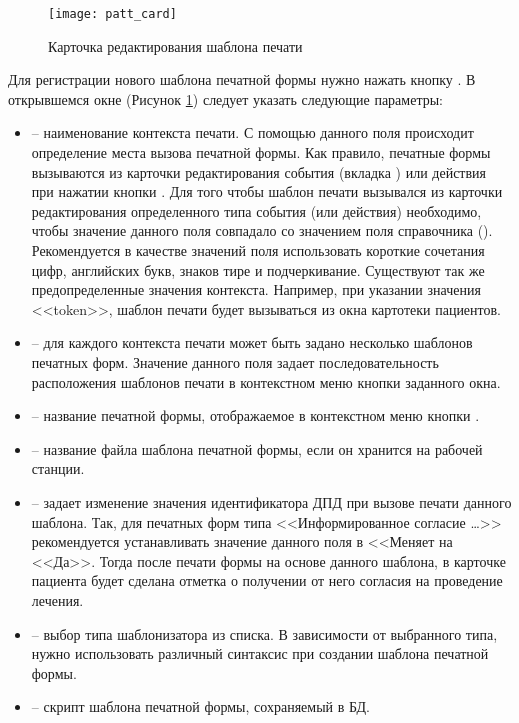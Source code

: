 \begin{figure}[ht]\centering
 \texttt{[image: patt\_card]}
 \caption{Карточка редактирования шаблона печати}
 \label{img_patt_card}
\end{figure}

Для регистрации нового шаблона печатной формы нужно нажать кнопку . В открывшемся окне (Рисунок \ref{img_patt_card}) следует указать следующие параметры:
\begin{itemize}
 \item {} – наименование контекста печати. С помощью данного поля происходит определение места вызова печатной формы. Как правило, печатные формы вызываются из карточки редактирования события (вкладка ) или действия при нажатии кнопки . Для того чтобы шаблон печати вызывался из карточки редактирования определенного типа события (или действия) необходимо, чтобы значение данного поля совпадало со значением поля  справочника  (). Рекомендуется в качестве значений поля  использовать короткие сочетания цифр, английских букв, знаков тире и подчеркивание. Существуют так же предопределенные значения контекста. Например, при указании значения <<token>>, шаблон печати будет вызываться из окна картотеки пациентов.
 \item {} – для каждого контекста печати может быть задано несколько шаблонов печатных форм. Значение данного поля задает последовательность расположения шаблонов печати в контекстном меню кнопки  заданного окна.
 \item {} – название печатной формы, отображаемое в контекстном меню кнопки .
 \item {} – название файла шаблона печатной формы, если он хранится на рабочей станции.
 \item {} – задает изменение значения идентификатора ДПД при вызове печати данного шаблона. Так, для печатных форм типа <<Информированное согласие …>> рекомендуется устанавливать значение данного поля в <<Меняет на <<Да>>. Тогда после печати формы на основе данного шаблона, в карточке пациента будет сделана отметка о получении от него согласия на проведение лечения.
 \item {} – выбор типа шаблонизатора из списка. В зависимости от выбранного типа, нужно использовать различный синтаксис при создании шаблона печатной формы.
 \item {} – скрипт шаблона печатной формы, сохраняемый в БД.
\end{itemize}

